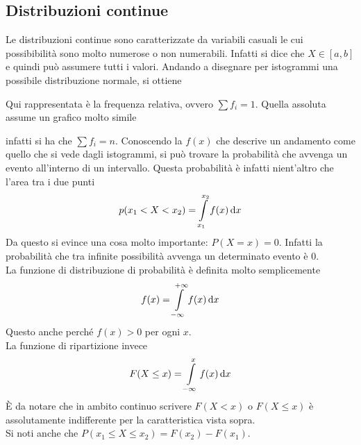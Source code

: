 \subsection{Distribuzioni continue}
Le distribuzioni continue sono caratterizzate da variabili casuali le cui possibibilità sono molto
numerose o non numerabili. Infatti si dice che $X\in[a,b]$ e quindi può assumere tutti i valori.
Andando a disegnare per istogrammi una possibile distribuzione normale, si ottiene
\begin{center}
\end{center}
Qui rappresentata è la frequenza relativa, ovvero $\sum f_i = 1$. Quella assoluta assume un grafico
molto simile
\begin{center}
\end{center}
infatti si ha che $\sum f_i = n$. Conoscendo la $f(x)$ che descrive un andamento come quello che
si vede dagli istogrammi, si può trovare la probabilità che avvenga un evento all'interno di un
intervallo. Questa probabilità è infatti nient'altro che l'area tra i due punti
\begin{equation*}
  p(x_1<X<x_2) = \int\limits_{x_1}^{x_2} f(x)\mathop{}\!\mathrm{d} x
\end{equation*}
Da questo si evince una cosa molto importante: $P(X=x)=0$. Infatti la probabilità che tra infinite
possibilità avvenga un determinato evento è $0$.\\ [\baselineskip]
La funzione di distribuzione di probabilità è definita molto semplicemente
\begin{equation*}
  f(x)=\int\limits_{-\infty}^{+\infty}f(x)\mathop{}\!\mathrm{d} x 
\end{equation*}
Questo anche perché $f(x)>0$ per ogni $x$.\\
La funzione di ripartizione invece
\begin{equation*}
  F(X\leq x) = \int\limits_{-\infty}^{x} f(x)\mathop{}\!\mathrm{d} x
\end{equation*}
È da notare che in ambito continuo scrivere $F(X<x)$ o $F(X\leq x)$ è assolutamente indifferente 
per la caratteristica vista sopra.\\
Si noti anche che $P(x_1\leq X\leq x_2)=F(x_2)-F(x_1)$.

